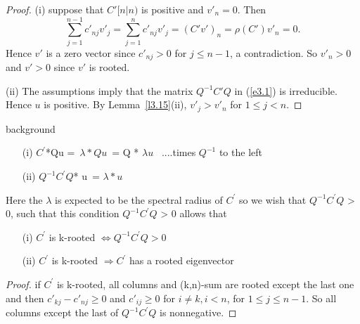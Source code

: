 \documentclass{beamer}
\theoremstyle{plain}
\theoremstyle{definition}
\begin{document}
\begin{frame}

\begin{proof}
(i) suppose that $C' [n|n)$ is positive and $v'_n=0$. Then
$$\sum_{j=1}^{n-1}c'_{nj}v'_j=\sum_{j=1}^nc'_{nj}v'_j=(C'v')_n=\rho(C')v'_n=0.$$
Hence $v'$ is a zero vector since $c'_{nj}>0$ for $j\leq n-1$, a contradiction. So $v'_n>0$ and $v'>0$ since $v'$ is rooted.


(ii) The assumptions imply that the matrix $Q^{-1}C'Q$ in (\ref{e3.1}) is irreducible.
Hence $u$ is positive. By Lemma~\ref{l3.15}(ii), $v'_j>v'_n$ for $1\leq j<n.$
\end{proof}



\end{frame}

\begin{frame}{background}

    \begin{enumerate}
        \item[(i)] $C^{ '}$*Qu = $\lambda * Qu $ = Q * $\lambda u$  ....times $Q^{-1}$ to the left
        \item[(ii)] $Q^{-1} C^{ '}Q$* u = $\lambda * u$
    \end{enumerate}

    Here the $\lambda$ is expected to be the spectral radius of $C^{ '}$ so we wish that $Q^{-1}C^{ '}Q$ > 0, such that this condition $Q^{-1}C^{ '}Q$ > 0 allows that \\
    \begin{enumerate}
        \item[(i)] $ C^{ '}$ is k-rooted $\Leftrightarrow Q^{-1}C^{ '}Q > 0$
        \item[(ii)] $ C^{ '}$ is k-rooted $\Rightarrow C^{ '}$ has a rooted eigenvector
    \end{enumerate}
	\begin{proof}
        if $C^{ '}$ is k-rooted, all columns and (k,n)-sum are rooted except the last one and then $c'_{kj}-c'_{nj} \geq 0$ and $c'_{ij} \geq 0$ for $i \neq k, i < n$, for $1 \leq j \leq n-1$. So all columns except the last of $Q^{-1}C^{ '}Q$ is nonnegative.
    \end{proof}


\end{frame}
\end{document}
